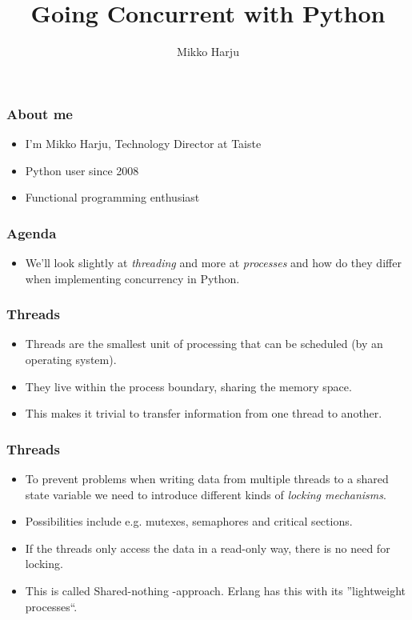 \documentclass[13pt,xcolor=dvipsnames]{beamer}
\title{Going Concurrent with Python}
\author{Mikko Harju}
\institute{Taiste}
\begin{document}
\begin{frame}
\titlepage
\end{frame}

\begin{frame}
    \frametitle{About me}
    \begin{itemize}
        \item I'm Mikko Harju, Technology Director at Taiste
        \pause
        \item Python user since 2008
        \pause
        \item Functional programming enthusiast
    \end{itemize}
\end{frame}

\begin{frame}
    \frametitle{Agenda}
    \begin{itemize}
        \item We'll look slightly at \emph{threading} and more at \emph{processes} and how do they differ when
            implementing concurrency in Python.
    \end{itemize}
\end{frame}

\begin{frame}
    \frametitle{Threads}
    \begin{itemize}
        \item Threads are the smallest unit of processing that can be scheduled (by an operating system).
        \pause
        \item They live within the process boundary, sharing the memory space.
        \pause
        \item This makes it trivial to transfer information from one thread to another.
    \end{itemize}
\end{frame}

\begin{frame}
    \frametitle{Threads}
    \begin{itemize}
        \item To prevent problems when writing data from multiple threads to a shared state variable we need to
            introduce different kinds of \emph{locking mechanisms}.
        \pause
        \item Possibilities include e.g. mutexes, semaphores and critical sections.
        \pause
        \item If the threads only access the data in a read-only way, there is no need for locking.
        \pause
        \item This is called Shared-nothing -approach. Erlang has this with its ''lightweight processes``.
    \end{itemize}
\end{frame}
\end{document}

